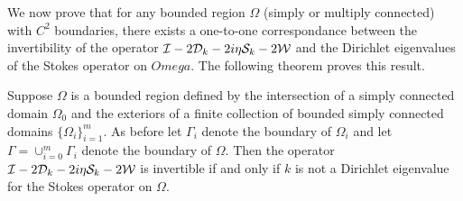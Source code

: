 We now prove that for any bounded region $\Omega$ (simply or multiply
connected) with $C^{2}$ boundaries, there exists a one-to-one correspondance
between the invertibility of the operator
$\mathcal I - 2{\mathcal D}_{k} - 2i\eta {\mathcal S}_{k} - 2{\mathcal W}$ and the Dirichlet eigenvalues
of the Stokes operator on $Omega$. 
The following theorem proves this result.

\begin{thm}
Suppose $\Omega$ is a bounded region defined by the intersection of a 
simply connected domain $\Omega_{0}$ and the exteriors of a finite collection
of bounded simply connected domains $\{ \Omega_{i} \}_{i=1}^{m}$.
As before let $\Gamma_{i}$ denote the boundary of $\Omega_{i}$ and let
$\Gamma = \cup_{i=0}^{m} \Gamma_{i}$ denote the boundary of $\Omega$.
Then the operator $\mathcal I - 2{\mathcal D}_{k} - 2i\eta {\mathcal S}_{k} - 2{\mathcal W}$
is invertible if and only if $k$ is not a Dirichlet eigenvalue
for the Stokes operator on $\Omega$.
\end{thm}

